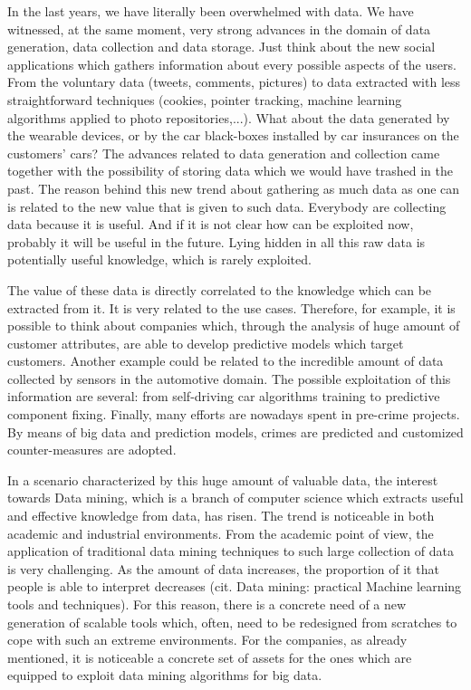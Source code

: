 In the last years, we have literally been overwhelmed with data. 
We have witnessed, at the same moment, very strong advances in the domain of data generation, data collection and data storage.
Just think about the new social applications which gathers information about every possible aspects of the users. From the voluntary data (tweets, comments, pictures) to data extracted with less straightforward techniques (cookies, pointer tracking, machine learning algorithms applied to photo repositories,...). What about the data generated by the wearable devices, or by the car black-boxes installed by car insurances on the customers' cars?
The advances related to data generation and collection came together with the possibility of storing data which we would have trashed in the past. The reason behind this new trend about gathering as much data as one can is related to the new value that is given to such data.
Everybody are collecting data because it is useful. And if it is not clear how can be exploited now, probably it will be useful in the future.
Lying hidden in all this raw data is potentially useful knowledge, which is rarely exploited. 

The value of these data is directly correlated to the knowledge which can be extracted from it. It is very related to the use cases. Therefore, for example, it is possible to think about companies which, through the analysis of huge amount of customer attributes, are able to develop predictive models which target customers. Another example could be related to the incredible amount of data collected by sensors in the automotive domain. The possible exploitation of this information are several: from self-driving car algorithms training to predictive component fixing. Finally, many efforts are nowadays spent in pre-crime projects. By means of big data and prediction models, crimes are predicted and customized counter-measures are adopted.

In a scenario characterized by this huge amount of valuable data,  the interest towards Data mining, which is a branch of computer science which extracts useful and effective knowledge from data, has risen. The trend is noticeable in both academic and industrial environments. From the academic point of view, the application of traditional data mining techniques to such large collection of data is very challenging. As the amount of data increases, the proportion of it that people is able to interpret decreases (cit. Data mining: practical Machine learning tools and techniques). For this reason, there is a concrete need of a new generation of scalable tools which, often, need to be redesigned from scratches to cope with such an extreme environments.
For the companies, as already mentioned, it is noticeable a concrete set of assets for the ones which are equipped to exploit data mining algorithms for big data.

